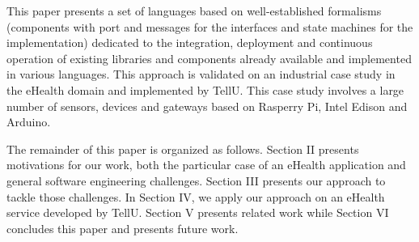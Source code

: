 This paper presents a set of languages based on well-established formalisms (components with port and messages for the interfaces and state machines for the implementation)  dedicated to the integration, deployment and continuous operation of existing libraries and components already available and implemented in various languages. This approach is validated on an industrial case study in the eHealth domain and implemented by TellU. This case study involves a large number of sensors, devices and gateways based on Rasperry Pi, Intel Edison and Arduino. 

The remainder of this paper is organized as follows. Section II presents motivations for our work, both the particular case of an eHealth application and general software engineering challenges. Section III presents our approach to tackle those challenges. In Section IV, we apply our approach on an eHealth service developed by TellU. Section V presents related work while Section VI concludes this paper and presents future work. 
